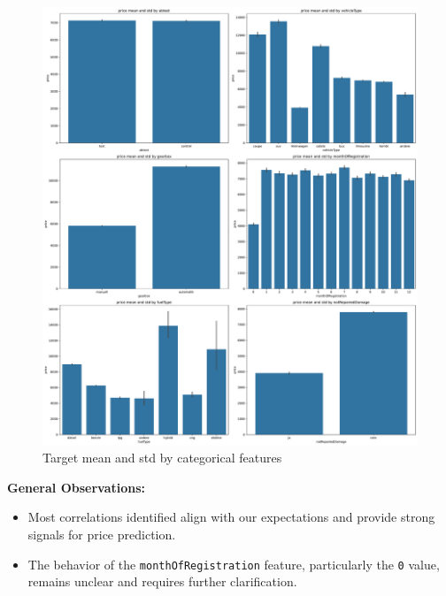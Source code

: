 \documentclass[conference]{IEEEtran}
\begin{document}
\begin{figure}[H]
\centering
\includegraphics[width=\linewidth]{figures/cat_features_barplot.pdf}
\caption{Target mean and std by categorical features}
\label{fig:cat_features_barplot}
\end{figure}

\vspace{1em}
\noindent\textbf{General Observations:}
\begin{itemize}
    \item Most correlations identified align with our expectations and provide
            strong signals for price prediction.
    \item The behavior of the \texttt{monthOfRegistration} feature,
            particularly the \texttt{0} value, remains unclear and requires
            further clarification.
\end{itemize}
\end{document}
